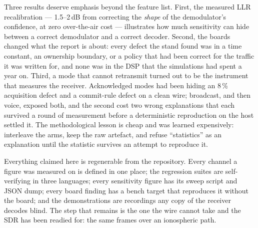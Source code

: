 Three results deserve emphasis beyond the feature list.  First, the
measured LLR recalibration --- 1.5--2\,dB from correcting the
\emph{shape} of the demodulator's confidence, at zero over-the-air
cost --- illustrates how much sensitivity can hide between a correct
demodulator and a correct decoder.  Second, the boards changed what
the report is about: every defect the stand found was in a time
constant, an ownership boundary, or a policy that had been correct for
the traffic it was written for, and none was in the DSP that the
simulations had spent a year on.  Third, a mode that cannot
retransmit turned out to be the instrument that measures the
receiver.  Acknowledged modes had been hiding an 8\,\% acquisition
defect and a commit-rule defect on a clean wire; broadcast, and then
voice, exposed both, and the second cost two wrong explanations that
each survived a round of measurement before a deterministic
reproduction on the host settled it.  The methodological lesson is
cheap and was learned expensively: interleave the arms, keep the raw
artefact, and refuse ``statistics'' as an explanation until the
statistic survives an attempt to reproduce it.

Everything claimed here is regenerable from the repository.  Every
channel a figure was measured on is defined in one place; the
regression suites are self-verifying in three languages; every
sensitivity figure has its sweep script and JSON dump; every board
finding has a bench target that reproduces it without the board; and
the demonstrations are recordings any copy of the receiver decodes
blind.  The step that remains is the one the wire cannot take and the
SDR has been readied for: the same frames over an ionospheric path.
